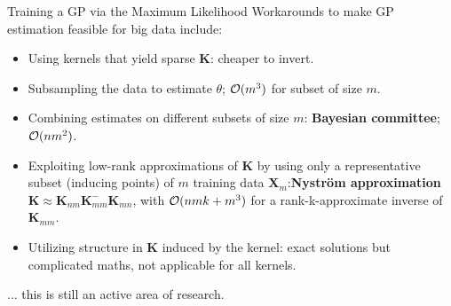\begin{frame}[c,allowframebreaks]{Training a GP via the Maximum Likelihood}
\framebreak
Workarounds to make GP estimation feasible for big data include:

\begin{itemize}
\item Using kernels that yield sparse $\bm K$: cheaper to invert.
\vspace{3mm}
\item Subsampling the data to estimate $\theta$; $\mathcal{O}(m^3)$ for subset of size $m$.
\vspace{3mm}
\item Combining estimates on different subsets of size $m$: \textbf{Bayesian committee}; $\mathcal{O}(n m^2)$.
\vspace{3mm}
\item Exploiting low-rank approximations of $\bm{K}$ by using only a representative subset (inducing points) of $m$ training data $\bm X_m$:\textbf{Nyström approximation} $\bm K\approx\bm K_{nm} \bm K_{mm}^{-} \bm K_{mn}$, with $\mathcal{O}(nmk + m^3)$ for a rank-k-approximate inverse of $\bm K_{mm}$.
\vspace{3mm}
\item Utilizing structure in $\bm{K}$ induced by the kernel: exact solutions but complicated maths, not applicable for all kernels.
\end{itemize}

\vspace{3mm}
... this is still an active area of research.




\end{frame}


